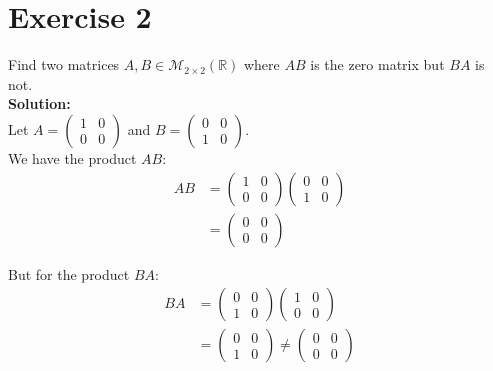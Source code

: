 \documentclass{article}
\begin{document}
\newpage

\section*{Exercise 2}
Find two matrices $A, B \in \mathcal{M}_{2\times 2}(\mathbb{R})$ where $AB$ is the zero matrix but $BA$ is not. \\

\textbf{Solution: } \\

Let $A = \begin{pmatrix} 1 & 0 \\ 0 & 0 \end{pmatrix}$ and $B = \begin{pmatrix} 0 & 0 \\ 1 & 0 \end{pmatrix}$. \\

We have the product $AB$:
\begin{align*}
AB &= \begin{pmatrix} 1 & 0 \\ 0 & 0 \end{pmatrix} \begin{pmatrix} 0 & 0 \\ 1 & 0 \end{pmatrix} \\
&= \begin{pmatrix} 0 & 0 \\ 0 & 0 \end{pmatrix}
\end{align*}

But for the product $BA$:
\begin{align*}
BA &= \begin{pmatrix} 0 & 0 \\ 1 & 0 \end{pmatrix} \begin{pmatrix} 1 & 0 \\ 0 & 0 \end{pmatrix} \\
&= \begin{pmatrix} 0 & 0 \\ 1 & 0 \end{pmatrix} \neq \begin{pmatrix} 0 & 0 \\ 0 & 0 \end{pmatrix}
\end{align*}

\newpage
\end{document}
